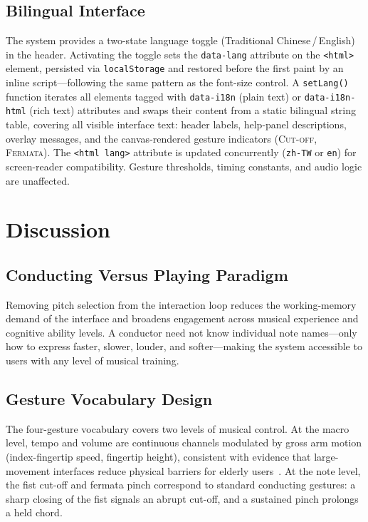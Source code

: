 \documentclass[conference]{IEEEtran}
\begin{document}
\subsection{Bilingual Interface}

The system provides a two-state language toggle (Traditional Chinese\,/\,English)
in the header. Activating the toggle sets the \texttt{data-lang}
attribute on the \texttt{<html>} element, persisted via
\texttt{localStorage} and restored before the first paint by an inline
script---following the same pattern as the font-size control. A
\texttt{setLang()} function iterates all elements tagged with
\texttt{data-i18n} (plain text) or \texttt{data-i18n-html} (rich text)
attributes and swaps their content from a static bilingual string table,
covering all visible interface text: header labels, help-panel
descriptions, overlay messages, and the canvas-rendered gesture
indicators (\textsc{Cut-off}, \textsc{Fermata}). The
\texttt{<html\,lang>} attribute is updated concurrently
(\texttt{zh-TW} or \texttt{en}) for screen-reader compatibility.
Gesture thresholds, timing constants, and audio logic are unaffected.

\section{Discussion}
\label{sec:discussion}

\subsection{Conducting Versus Playing Paradigm}

Removing pitch selection from the interaction loop reduces the
working-memory demand of the interface and broadens engagement across
musical experience and cognitive ability levels. A conductor need not
know individual note names---only how to express faster, slower,
louder, and softer---making the system accessible to users with any
level of musical training.

\subsection{Gesture Vocabulary Design}

The four-gesture vocabulary covers two levels of musical control. At
the macro level, tempo and volume are continuous channels modulated by
gross arm motion (index-fingertip speed, fingertip height), consistent
with evidence that large-movement interfaces reduce physical barriers for
elderly users~\cite{rw11,rw12}. At the note level, the fist cut-off
and fermata pinch correspond to standard conducting gestures: a sharp
closing of the fist signals an abrupt cut-off, and a sustained pinch
prolongs a held chord.
\end{document}
